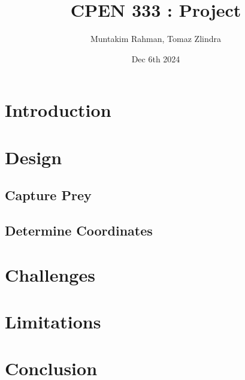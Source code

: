 \documentclass{article}
\title{CPEN 333 : Project}
\author{Muntakim Rahman, Tomaz Zlindra}
\date{Dec 6th 2024}
\begin{document}
\maketitle

\section{Introduction}

\section{Design}

\subsection{Capture Prey}
\subsection{Determine Coordinates}

\section{Challenges}
\section{Limitations}

\section{Conclusion}
\end{document}
